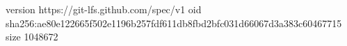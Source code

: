 version https://git-lfs.github.com/spec/v1
oid sha256:ae80e122665f502e1196b257fdf611db8fbd2bfc031d66067d3a383c60467715
size 1048672
